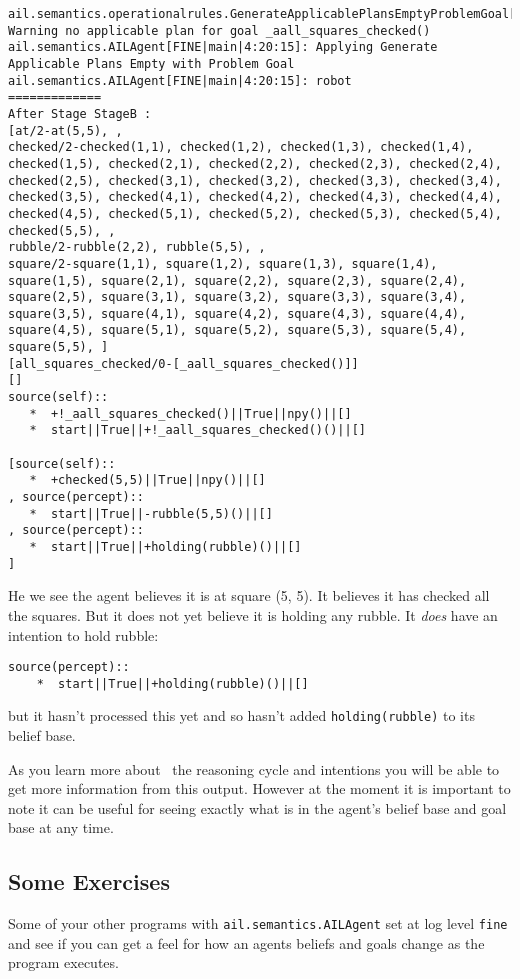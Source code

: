 \begin{verbatim}
ail.semantics.operationalrules.GenerateApplicablePlansEmptyProblemGoal[WARNING|main|4:20:15]: Warning no applicable plan for goal _aall_squares_checked() 
ail.semantics.AILAgent[FINE|main|4:20:15]: Applying Generate Applicable Plans Empty with Problem Goal 
ail.semantics.AILAgent[FINE|main|4:20:15]: robot
=============
After Stage StageB :
[at/2-at(5,5), , 
checked/2-checked(1,1), checked(1,2), checked(1,3), checked(1,4), checked(1,5), checked(2,1), checked(2,2), checked(2,3), checked(2,4), checked(2,5), checked(3,1), checked(3,2), checked(3,3), checked(3,4), checked(3,5), checked(4,1), checked(4,2), checked(4,3), checked(4,4), checked(4,5), checked(5,1), checked(5,2), checked(5,3), checked(5,4), checked(5,5), , 
rubble/2-rubble(2,2), rubble(5,5), , 
square/2-square(1,1), square(1,2), square(1,3), square(1,4), square(1,5), square(2,1), square(2,2), square(2,3), square(2,4), square(2,5), square(3,1), square(3,2), square(3,3), square(3,4), square(3,5), square(4,1), square(4,2), square(4,3), square(4,4), square(4,5), square(5,1), square(5,2), square(5,3), square(5,4), square(5,5), ]
[all_squares_checked/0-[_aall_squares_checked()]]
[]
source(self):: 
   *  +!_aall_squares_checked()||True||npy()||[]
   *  start||True||+!_aall_squares_checked()()||[]

[source(self):: 
   *  +checked(5,5)||True||npy()||[]
, source(percept):: 
   *  start||True||-rubble(5,5)()||[]
, source(percept):: 
   *  start||True||+holding(rubble)()||[]
] 
\end{verbatim}
He we see the agent believes it is at square (5, 5).  It believes it has checked all the squares.  But it does not yet believe it is holding any rubble.  It \emph{does} have an intention to hold rubble:
\begin{verbatim}
source(percept):: 
    *  start||True||+holding(rubble)()||[]
\end{verbatim}
but it hasn't processed this yet and so hasn't added \texttt{holding(rubble)} to its belief base.

As you learn more about \gwendolen\ the reasoning cycle and intentions you will be able to get more information from this output.  However at the moment it is important to note it can be useful for seeing exactly what is in the agent's belief base and goal base at any time.

\subsection{Some Exercises}
Some of your other programs with \texttt{ail.semantics.AILAgent} set at log level \texttt{fine} and see if you can get a feel for how an agents beliefs and goals change as the program executes.

